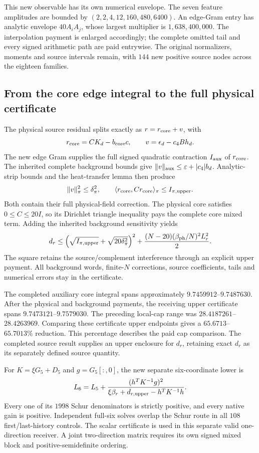 This new observable has its own numerical envelope. The seven feature amplitudes are bounded by $(2,2,4,12,160,480,6400)$. An edge-Gram entry has analytic envelope $40A_iA_j$, whose largest multiplier is $1{,}638{,}400{,}000$. The interpolation payment is enlarged accordingly; the complete omitted tail and every signed arithmetic path are paid entrywise. The original normalizers, moments and source intervals remain, with $144$ new positive source nodes across the eighteen families. 

\subsection{From the core edge integral to the full physical certificate}

The physical source residual splits exactly as $r=r_{\rm core}+v$, with
\[
 r_{\rm core}=CK_d-b_{\rm core}c,\qquad
 v=\epsilon_d-c_4Bh_d.
\]
The new edge Gram supplies the full signed quadratic contraction $I_{\rm aux}$ of $r_{\rm core}$. The inherited complete background bounds give $\|v\|_{\rm aux}\leq\varepsilon+|c_4|b_d$. Analytic-strip bounds and the heat-transfer lemma then produce
\[
 \|v\|_\pi^2\leq\delta_\pi^2,
 \qquad\langle r_{\rm core},Cr_{\rm core}\rangle_\pi
                                  \leq I_{\pi,\rm upper}.
\]
Both contain their full physical-field correction. The physical core satisfies $0\leq C\leq20I$, so its Dirichlet triangle inequality pays the complete core mixed term. Adding the inherited background sensitivity yields
\[
 d_r\leq
 \left(\sqrt{I_{\pi,\rm upper}}+\sqrt{20\delta_\pi^2}\right)^2
 +\frac{(N-20)(\beta_{\rm ph}/N)^2L_r^2}{2}.
\]
The square retains the source/complement interference through an explicit upper payment. All background words, finite-$N$ corrections, source coefficients, tails and numerical errors stay in the certificate. 

The completed auxiliary core integral spans approximately $9.7459912$--$9.7487630$. After the physical and background payments, the receiving upper certificate spans $9.7473121$--$9.7579030$. The preceding local-cap range was $28.4187261$--$28.4263969$. Comparing these certificate upper endpoints gives a $65.6713$--$65.7013\%$ reduction. This percentage describes the paid cap comparison. The completed source result supplies an upper enclosure for $d_r$, retaining exact $d_r$ as its separately defined source quantity. 

For $K=\xi G_5+D_5$ and $g=G_5[:,0]$, the new separate six-coordinate lower is
\[
 L_6=L_5+
 \frac{(h^TK^{-1}g)^2}
 {\xi\beta_r+d_{r,\rm upper}-h^TK^{-1}h}.
\]
Every one of its $1998$ Schur denominators is strictly positive, and every native gain is positive. Independent full-six solves overlap the Schur route in all $108$ first/last-history controls. The scalar certificate is used in this separate valid one-direction receiver. A joint two-direction matrix requires its own signed mixed block and positive-semidefinite ordering.

